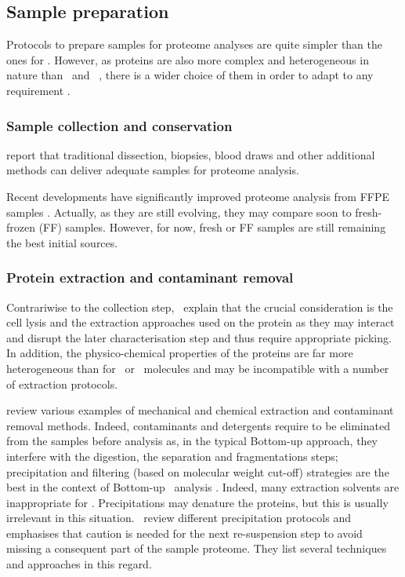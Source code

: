 \subsection{Sample preparation}\label{subsec:ProtSampPrep}
Protocols to prepare samples for proteome analyses are quite simpler than the
ones for \Rnaseq. However, as proteins are also more complex and heterogeneous in
nature than \DNA\ and \RNA\ , there is a wider choice of them
in order to adapt to any requirement .

\subsubsection{Sample collection and conservation}
\cite{Feist2015} report that traditional dissection, biopsies, blood draws and
other additional methods can deliver adequate samples for proteome analysis.

Recent developments have significantly improved proteome analysis from
\gls{FFPE} samples . Actually, as they are still evolving,
they may compare soon to fresh-frozen (\gls{FF}) samples.
However, for now, fresh or \gls{FF} samples are still remaining the best initial
sources.

\subsubsection{Protein extraction and contaminant removal}
Contrariwise to the collection step,~\cite{Feist2015} explain that the crucial
consideration is the cell lysis and the extraction approaches used on
the protein as they may interact and disrupt the later characterisation step and
thus require appropriate picking. In addition, the physico-chemical properties of
the proteins are far more heterogeneous than for \DNA\ or \RNA\ molecules
 and may be incompatible with a number of extraction protocols.

\cite{Gutstein2008,Bodzon-Kulakowska2007,Visser2005,Hilbrig2003} review various
examples of mechanical and chemical extraction and contaminant removal methods.
Indeed, contaminants and detergents require to be eliminated from the samples
before analysis as, in the typical \gls{Bottom-up} approach, they interfere
with the digestion, the separation and fragmentations steps; precipitation and
filtering (based on molecular weight cut-off) strategies are the best in the
context of \gls{Bottom-up} \ms\ analysis . Indeed, many
extraction solvents are inappropriate for \ms. Precipitations may denature the
proteins, but this is usually irrelevant in this situation.~\cite{Feist2015}
review different precipitation protocols and emphasises that caution is needed
for the next re-suspension step to avoid missing a consequent part of the
sample proteome. They list several techniques and approaches in this regard.

